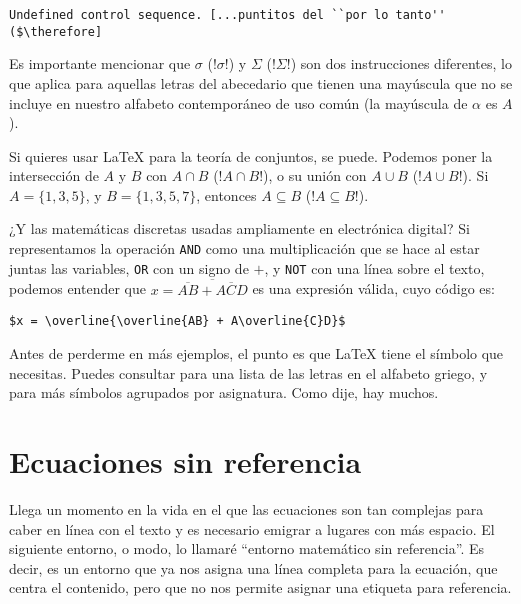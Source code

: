 \begin{lstlisting}[style=errores]
Undefined control sequence. [...puntitos del ``por lo tanto'' ($\therefore]
\end{lstlisting}

Es importante mencionar que $\sigma$ (!$\sigma$!) y $\Sigma$ (!$\Sigma$!) son dos instrucciones diferentes, lo que aplica para aquellas letras del abecedario que tienen una mayúscula que no se incluye en nuestro alfabeto contemporáneo de uso común (la mayúscula de $\alpha$ es $A$).

Si quieres usar \LaTeX{} para la teoría de conjuntos, se puede. Podemos poner la intersección de $A$ y $B$ con $A \cap B$ (!$A \cap B$!), o su unión con $A \cup B$ (!$A \cup B$!). Si $A = \{1, 3, 5\}$, y $B = \{1, 3, 5, 7\}$, entonces $A \subseteq B$ (!$A \subseteq B$!).

¿Y las matemáticas discretas usadas ampliamente en electrónica digital? Si representamos la operación \texttt{AND} como una multiplicación que se hace al estar juntas las variables, \texttt{OR} con un signo de $+$, y \texttt{NOT} con una línea sobre el texto, podemos entender que $x = \overline{\overline{AB} + A\overline{C}D}$ es una expresión válida, cuyo código es:

\begin{lstlisting}[style=latex,numbers=none,mathescape=false]
$x = \overline{\overline{AB} + A\overline{C}D}$
\end{lstlisting}

Antes de perderme en más ejemplos, el punto es que \LaTeX{} tiene el símbolo que necesitas. Puedes consultar \cite{bib:math_symbols} para una lista de las letras en el alfabeto griego, y \cite{bib:math_symbols_subject} para más símbolos agrupados por asignatura. Como dije, hay muchos.



\section{Ecuaciones sin referencia}
\label{sec:ecuaciones_sin_referencia}



Llega un momento en la vida en el que las ecuaciones son tan complejas para caber en línea con el texto y es necesario emigrar a lugares con más espacio. El siguiente entorno, o modo, lo llamaré ``entorno matemático sin referencia''. Es decir, es un entorno que ya nos asigna una línea completa para la ecuación, que centra el contenido, pero que no nos permite asignar una etiqueta para referencia.

